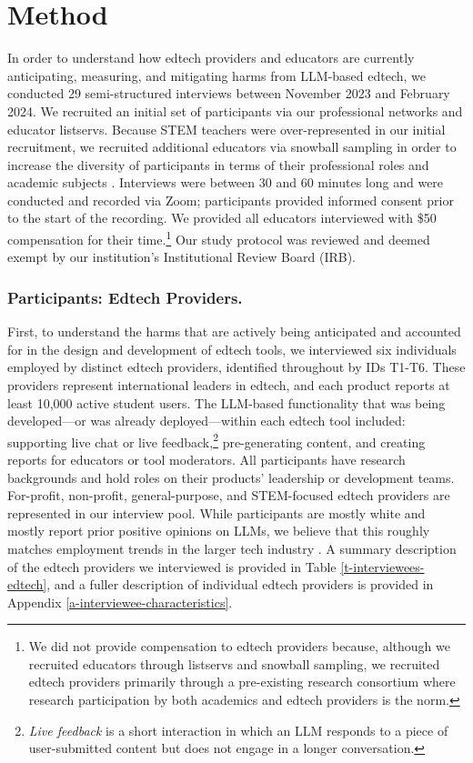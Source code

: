 \section{Method}\label{s-method}



In order to understand how edtech providers and educators are currently anticipating, measuring, and mitigating harms from LLM-based edtech, we conducted 29 semi-structured interviews \cite{Creswell2011} between November 2023 and February 2024. We recruited an initial set of participants via our professional networks and educator listservs. Because STEM teachers were over-represented in our initial recruitment, we recruited additional educators via snowball sampling in order to increase the diversity of participants in terms of their professional roles and academic subjects \cite{morgan2008snowball}. Interviews were between 30 and 60 minutes long and were conducted and recorded via Zoom; participants provided informed consent prior to the start of the recording. We provided all educators interviewed with \$50 compensation for their time.\footnote{We did not provide compensation to edtech providers because, although we recruited educators through listservs and snowball sampling, we recruited edtech providers primarily through a pre-existing research consortium where research participation by both academics and edtech providers is the norm.} Our study protocol was reviewed and deemed exempt by our institution's Institutional Review Board (IRB).

\subsubsection*{Participants: Edtech Providers.} First, to understand the harms that are actively being anticipated and accounted for in the design and development of edtech tools, we interviewed six individuals employed by distinct edtech providers, identified throughout by IDs T1-T6. These providers represent international leaders in edtech, and each product reports at least 10,000 active student users. The LLM-based functionality that was being developed---or was already deployed---within each edtech tool included: supporting live chat or live feedback,\footnote{\textit{Live feedback} is a short interaction in which an LLM responds to a piece of user-submitted content but does not engage in a longer conversation.} pre-generating content, and creating reports for educators or tool moderators. All participants have research backgrounds and hold roles on their products' leadership or development teams. For-profit, non-profit, general-purpose, and STEM-focused edtech providers are represented in our interview pool. While participants are mostly white and mostly report prior positive opinions on LLMs, we believe that this roughly matches employment trends in the larger tech industry \cite{diversity_tech}. A summary description of the edtech providers we interviewed is provided in Table \ref{t-interviewees-edtech}, and a fuller description of individual edtech providers is provided in Appendix \ref{a-interviewee-characteristics}. 

